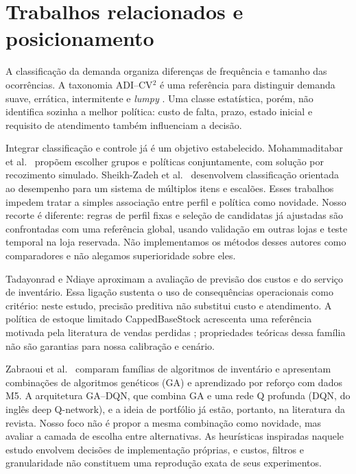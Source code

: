 \documentclass[preprint,12pt]{elsarticle}
\begin{document}
\section{Trabalhos relacionados e posicionamento}
A classificação da demanda organiza diferenças de frequência e tamanho das ocorrências. A taxonomia ADI--CV$^2$ é uma referência para distinguir demanda suave, errática, intermitente e \textit{lumpy} \cite{syntetos2005}. Uma classe estatística, porém, não identifica sozinha a melhor política: custo de falta, prazo, estado inicial e requisito de atendimento também influenciam a decisão.

Integrar classificação e controle já é um objetivo estabelecido. Mohammaditabar et al.\ \cite{Mohammaditabar2012Integrated} propõem escolher grupos e políticas conjuntamente, com solução por recozimento simulado. Sheikh-Zadeh et al.\ \cite{SheikhZadeh2021PBIC} desenvolvem classificação orientada ao desempenho para um sistema de múltiplos itens e escalões. Esses trabalhos impedem tratar a simples associação entre perfil e política como novidade. Nosso recorte é diferente: regras de perfil fixas e seleção de candidatas já ajustadas são confrontadas com uma referência global, usando validação em outras lojas e teste temporal na loja reservada. Não implementamos os métodos desses autores como comparadores e não alegamos superioridade sobre eles.

Tadayonrad e Ndiaye \cite{sca_f81ad2b3e023} aproximam a avaliação de previsão dos custos e do serviço de inventário. Essa ligação sustenta o uso de consequências operacionais como critério: neste estudo, precisão preditiva não substitui custo e atendimento. A política de estoque limitado CappedBaseStock acrescenta uma referência motivada pela literatura de vendas perdidas \cite{Xin2021CappedBaseStock}; propriedades teóricas dessa família não são garantias para nossa calibração e cenário.

Zabraoui et al.\ \cite{sca_27e994c54848} comparam famílias de algoritmos de inventário e apresentam combinações de algoritmos genéticos (GA) e aprendizado por reforço com dados M5. A arquitetura GA--DQN, que combina GA e uma rede Q profunda (DQN, do inglês deep Q-network), e a ideia de portfólio já estão, portanto, na literatura da revista. Nosso foco não é propor a mesma combinação como novidade, mas avaliar a camada de escolha entre alternativas. As heurísticas inspiradas naquele estudo envolvem decisões de implementação próprias, e custos, filtros e granularidade não constituem uma reprodução exata de seus experimentos.
\end{document}

